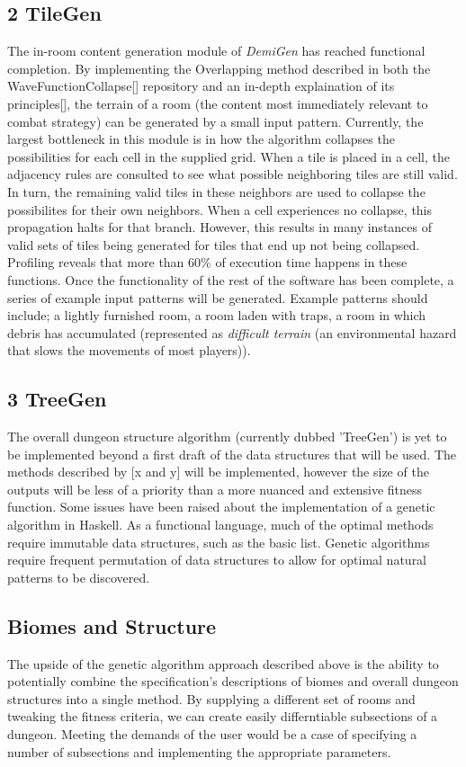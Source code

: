 \documentclass{article}
\begin{document}
\subsection{2 TileGen}
The in-room content generation module of \textit{DemiGen} has reached functional completion. By implementing the Overlapping method described in both the WaveFunctionCollapse[] repository and an in-depth explaination of its principles[], the terrain of a room (the content most immediately relevant to combat strategy) can be generated by a small input pattern.
\linebreak
Currently, the largest bottleneck in this module is in how the algorithm collapses the possibilities for each cell in the supplied grid. When a tile is placed in a cell, the adjacency rules are consulted to see what possible neighboring tiles are still valid. In turn, the remaining valid tiles in these neighbors are used to collapse the possibilites for their own neighbors. When a cell experiences no collapse, this propagation halts for that branch. However, this results in many instances of valid sets of tiles being generated for tiles that end up not being collapsed. Profiling reveals that more than 60\% of execution time happens in these functions. 
\linebreak
Once the functionality of the rest of the software has been complete, a series of example input patterns will be generated. Example patterns should include; a lightly furnished room, a room laden with traps, a room in which debris has accumulated (represented as \textit{difficult terrain} (an environmental hazard that slows the movements of most players)). 

\subsection{3 TreeGen}
The overall dungeon structure algorithm (currently dubbed 'TreeGen') is yet to be implemented beyond a first draft of the data structures that will be used. The methods described by [x and y] will be implemented, however the size of the outputs will be less of a priority than a more nuanced and extensive fitness function. Some issues have been raised about the implementation of a genetic algorithm in Haskell. As a functional language, much of the optimal methods require immutable data structures, such as the basic list. Genetic algorithms require frequent permutation of data structures to allow for optimal natural patterns to be discovered. 

\subsection{Biomes and Structure}
The upside of the genetic algorithm approach described above is the ability to potentially combine the specification's descriptions of biomes and overall dungeon structures into a single method. By supplying a different set of rooms and tweaking the fitness criteria, we can create easily differntiable subsections of a dungeon. Meeting the demands of the user would be a case of specifying a number of subsections and implementing the appropriate parameters.
\end{document}
